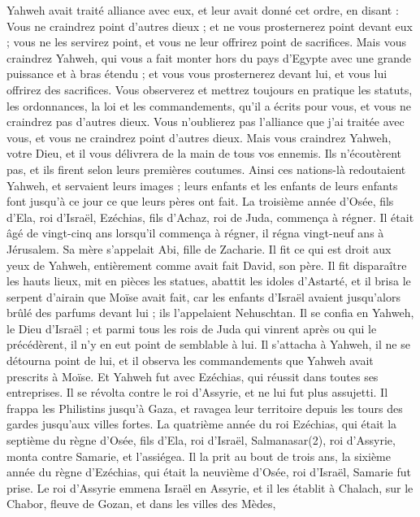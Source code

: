 \begin{multicols}{2}
Yahweh avait traité alliance avec eux, et leur avait donné cet ordre, en disant : Vous ne craindrez point d’autres dieux ; et ne vous prosternerez point devant eux ; vous ne les servirez point, et vous ne leur offrirez point de sacrifices.
Mais vous craindrez Yahweh, qui vous a fait monter hors du pays d’Egypte avec une grande puissance et à bras étendu ; et vous vous prosternerez devant lui, et vous lui offrirez des sacrifices.
Vous observerez et mettrez toujours en pratique les statuts, les ordonnances, la loi et les commandements, qu’il a écrits pour vous, et vous ne craindrez pas d’autres dieux.
Vous n’oublierez pas l’alliance que j’ai traitée avec vous, et vous ne craindrez point d’autres dieux.
Mais vous craindrez Yahweh, votre Dieu, et il vous délivrera de la main de tous vos ennemis.
Ils n’écoutèrent pas, et ils firent selon leurs premières coutumes.
Ainsi ces nations-là redoutaient Yahweh, et servaient leurs images ; leurs enfants et les enfants de leurs enfants font jusqu’à ce jour ce que leurs pères ont fait.
\VerseOne{}La troisième année d’Osée, fils d’Ela, roi d’Israël, Ezéchias, fils d’Achaz, roi de Juda, commença à régner.
Il était âgé de vingt-cinq ans lorsqu’il commença à régner, il régna vingt-neuf ans à Jérusalem. Sa mère s’appelait Abi, fille de Zacharie.
Il fit ce qui est droit aux yeux de Yahweh, entièrement comme avait fait David, son père.
Il fit disparaître les hauts lieux, mit en pièces les statues, abattit les idoles d’Astarté\FTNT{}, et il brisa le serpent d’airain que Moïse avait fait, car les enfants d’Israël avaient jusqu’alors brûlé des parfums devant lui ; ils l’appelaient Nehuschtan.
Il se confia en Yahweh, le Dieu d’Israël ; et parmi tous les rois de Juda qui vinrent après ou qui le précédèrent, il n’y en eut point de semblable à lui.
Il s’attacha à Yahweh, il ne se détourna point de lui, et il observa les commandements que Yahweh avait prescrits à Moïse.
Et Yahweh fut avec Ezéchias, qui réussit dans toutes ses entreprises. Il se révolta contre le roi d’Assyrie, et ne lui fut plus assujetti.
Il frappa les Philistins jusqu’à Gaza, et ravagea leur territoire depuis les tours des gardes jusqu’aux villes fortes.
La quatrième année du roi Ezéchias, qui était la septième du règne d’Osée, fils d’Ela, roi d’Israël, Salmanasar(2), roi d’Assyrie, monta contre Samarie, et l’assiégea.
Il la prit au bout de trois ans, la sixième année du règne d’Ezéchias, qui était la neuvième d’Osée, roi d’Israël, Samarie fut prise.
Le roi d’Assyrie emmena Israël en Assyrie, et il les établit à Chalach, sur le Chabor, fleuve de Gozan, et dans les villes des Mèdes,

\end{multicols}

